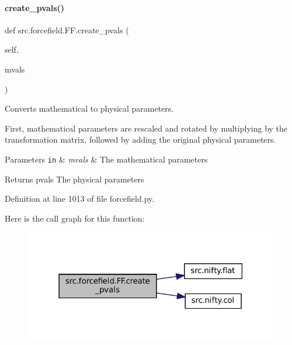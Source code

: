 \paragraph{\texorpdfstring{create\+\_\+pvals()}{create\_pvals()}}
{\footnotesize\ttfamily def src.\+forcefield.\+F\+F.\+create\+\_\+pvals (\begin{DoxyParamCaption}\item[{}]{self,  }\item[{}]{mvals }\end{DoxyParamCaption})}



Converts mathematical to physical parameters. 

First, mathematical parameters are rescaled and rotated by multiplying by the transformation matrix, followed by adding the original physical parameters.


\begin{DoxyParams}[1]{Parameters}
\mbox{\tt in}  & {\em mvals} & The mathematical parameters \\
\hline
\end{DoxyParams}
\begin{DoxyReturn}{Returns}
pvals The physical parameters 
\end{DoxyReturn}


Definition at line 1013 of file forcefield.\+py.

Here is the call graph for this function\+:
\nopagebreak
\begin{figure}[H]
\begin{center}
\leavevmode
\includegraphics[width=315pt]{classsrc_1_1forcefield_1_1FF_ad467744db1396ec74adab0c113317d36_cgraph}
\end{center}
\end{figure}
\mbox{\label{classsrc_1_1forcefield_1_1FF_a477e27c784066adde54ab153542bc2a5}} 
